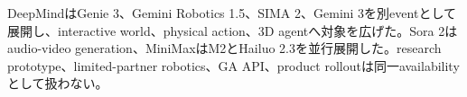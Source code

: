 
DeepMindはGenie 3、Gemini Robotics 1.5、SIMA 2、Gemini 3を別eventとして展開し、interactive world、physical action、3D agentへ対象を広げた。Sora 2はaudio-video generation、MiniMaxはM2とHailuo 2.3を並行展開した。research prototype、limited-partner robotics、GA API、product rolloutは同一availabilityとして扱わない。\autocite{src-661a3476d3d5,src-8530f5b0e216,src-d8e13386974c,src-dd5d9b8662f3}

